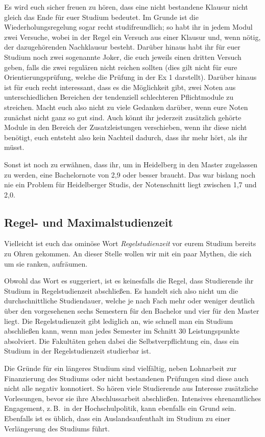 Es wird euch sicher freuen zu hören, dass eine nicht bestandene Klausur nicht gleich das Ende für euer Studium bedeutet. Im Grunde ist die Wiederholungsregelung sogar recht studifreundlich; so habt ihr in jedem Modul zwei Versuche, wobei in der Regel ein Versuch aus einer Klausur und, wenn nötig, der dazugehörenden Nachklausur besteht. Darüber hinaus habt ihr für euer Studium noch zwei sogenannte Joker, die euch jeweils einen dritten Versuch geben, falls die zwei regulären nicht reichen sollten (dies gilt nicht für eure Orientierungsprüfung, welche die Prüfung in der \gls{Ex} 1 darstellt). Darüber hinaus ist für euch recht interessant, dass es die Möglichkeit gibt, zwei Noten aus unterschiedlichen Bereichen der tendenziell schlechteren Pflichtmodule zu streichen. Macht euch also nicht zu viele Gedanken darüber, wenn eure Noten zunächst nicht ganz so gut sind. Auch könnt ihr jederzeit zusätzlich gehörte Module in den Bereich der Zusatzleistungen verschieben, wenn ihr diese nicht benötigt, euch entsteht also kein Nachteil dadurch, dass ihr mehr hört, als ihr müsst.

Sonst ist noch zu erwähnen, dass ihr, um in Heidelberg in den Master zugelassen zu werden, eine Bachelornote von 2,9 oder besser braucht. Das war bislang noch nie ein Problem für Heidelberger Studis, der Notenschnitt liegt zwischen 1,7 und 2,0.

\subsection{Regel- und Maximalstudienzeit}

Vielleicht ist euch das ominöse Wort \emph{Regelstudienzeit} vor eurem Studium bereits zu Ohren gekommen. An dieser Stelle wollen wir mit ein paar Mythen, die sich um sie ranken, aufräumen.

Obwohl das Wort es suggeriert, ist es keinesfalls die Regel, dass Studierende ihr Studium in Regelstudienzeit abschließen. Es handelt sich also nicht um die durchschnittliche Studiendauer, welche je nach Fach mehr oder weniger deutlich über den vorgesehenen sechs Semestern für den Bachelor und vier für den Master liegt. Die Regelstudienzeit gibt lediglich an, wie schnell man ein Studium abschließen kann, wenn man jedes Semester im Schnitt 30 Leistungspunkte absolviert. Die Fakultäten gehen dabei die Selbstverpflichtung ein, dass ein Studium in der Regelstudienzeit studierbar ist.

Die Gründe für ein längeres Studium sind vielfältig, neben Lohnarbeit zur Finanzierung des Studiums oder nicht bestandenen Prüfungen sind diese auch nicht alle negativ konnotiert. So hören viele Studierende aus Interesse zusätzliche Vorlesungen, bevor sie ihre Abschlussarbeit abschließen. Intensives ehrenamtliches Engagement, z.\,B.~in der Hochschulpolitik, kann ebenfalls ein Grund sein. Ebenfalls ist es üblich, dass ein Auslandsaufenthalt im Studium zu einer Verlängerung des Studiums führt.

